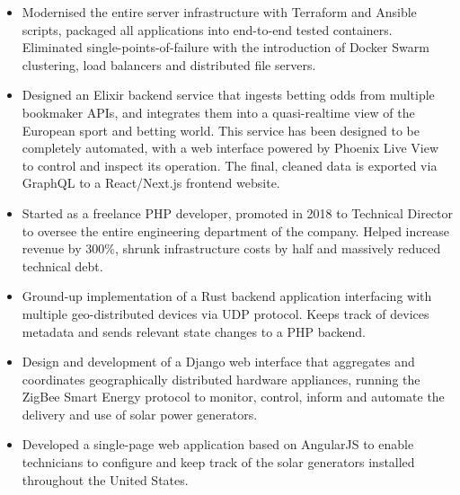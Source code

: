 \documentclass{resume}
\begin{document}
\begin{itemize}
\item Modernised the entire server infrastructure with Terraform and Ansible scripts, packaged all applications into end-to-end tested containers. Eliminated single-points-of-failure with the introduction of Docker Swarm clustering, load balancers and distributed file servers.
\item Designed an Elixir backend service that ingests betting odds from multiple bookmaker APIs, and integrates them into a quasi-realtime view of the European sport and betting world. This service has been designed to be completely automated, with a web interface powered by Phoenix Live View to control and inspect its operation. The final, cleaned data is exported via GraphQL to a React/Next.js frontend website.
\item Started as a freelance PHP developer, promoted in 2018 to Technical Director to oversee the entire engineering department of the company. Helped increase revenue by 300\%, shrunk infrastructure costs by half and massively reduced technical debt.
\end{itemize}


%


\begin{itemize}
\item Ground-up implementation of a Rust backend application interfacing with multiple geo-distributed devices via UDP protocol. Keeps track of devices metadata and sends relevant state changes to a PHP backend.
\end{itemize}


%


\begin{itemize}
\item Design and development of a Django web interface that aggregates and coordinates geographically distributed hardware appliances, running the ZigBee Smart Energy protocol to monitor, control, inform and automate the delivery and use of solar power generators.
\item Developed a single-page web application based on AngularJS to enable technicians to configure and keep track of the solar generators installed throughout the United States.
\end{itemize}
\end{document}
